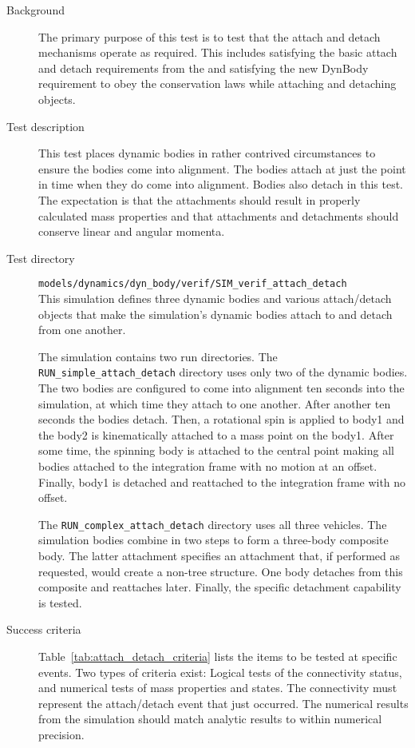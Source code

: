 \label{test:attach_detach}
\begin{description}
\item[Background] The primary purpose of this test is to test that
the \ModelDesc attach and detach mechanisms operate as required.
This includes satisfying the basic attach and detach requirements from
the \MASS and satisfying the new DynBody requirement to obey the conservation laws
while attaching and detaching objects.

\item[Test description]
This test places dynamic bodies in rather contrived circumstances to
ensure the bodies come into alignment. The bodies attach at just the point
in time when they do come into alignment. Bodies also detach in this test.
The expectation is that the attachments should result in properly calculated
mass properties and that attachments and detachments should conserve linear
and angular momenta.

\item[Test directory]
{\tt models/dynamics/dyn\_body/verif/SIM\_verif\_attach\_detach} \\
This simulation defines three dynamic bodies and various \BODYACTION
attach/detach objects that make the simulation's dynamic bodies
attach to and detach from one another.

The simulation contains two run directories.
The \verb+RUN_simple_attach_detach+ directory uses only two of the
dynamic bodies. The two bodies are configured to come into alignment
ten seconds into the simulation, at which time they attach to one another.
After another ten seconds the bodies detach. Then, a rotational spin is applied to body1 and the body2 is
kinematically attached to a mass point on the body1. After some time, the spinning body is attached to the central
point making all bodies attached to the integration frame with no motion at an offset. Finally, body1 is detached and
reattached to the integration frame with no offset.

The \verb+RUN_complex_attach_detach+ directory uses all three vehicles.
The simulation bodies combine in two steps to form a three-body composite body.
The latter attachment specifies an attachment that, if performed as requested,
would create a non-tree structure.
One body detaches from this composite and reattaches later. Finally,
the specific detachment capability is tested.

\item[Success criteria]
Table~\ref{tab:attach_detach_criteria} lists the items to be tested at specific
events. Two types of criteria exist:
Logical tests of the connectivity status, and numerical tests of mass properties
and states. The connectivity must represent the attach/detach event that just
occurred. The numerical results from the simulation should match analytic
results to within numerical precision.


\end{description}
